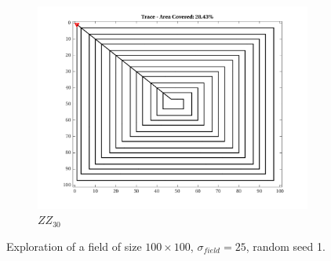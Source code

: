 \begin{figure}[htb!]
    \begin{subfigure}[t]{0.25\textwidth}
        \centering
        \includegraphics[width=\linewidth]{figures/path_zz_30p_100x100_sf_25_seed_1.png}
        \captionsetup{skip=0.20\baselineskip,size=footnotesize}
        \caption{$ZZ_{30}$}
    \end{subfigure}%
    \captionsetup{skip=0.20\baselineskip}
    \caption{Exploration of a field of size $100 \times 100$, $\sigma_{field} = 25$, random seed 1.}
    \label{fig:sf25}
\end{figure}

